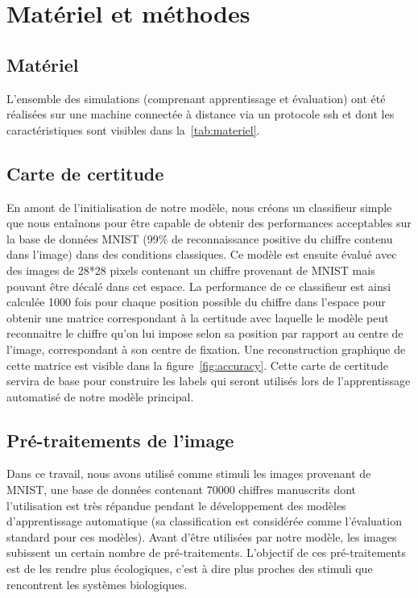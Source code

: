 
\chapter{Matériel et méthodes} %
\label{Materiel_methode} %

\section{Matériel}
L'ensemble des simulations (comprenant apprentissage et évaluation) ont été réalisées sur une machine connectée à distance via un protocole ssh et dont les caractéristiques sont visibles dans la~\autoref{tab:materiel}.

\section{Carte de certitude}
En amont de l'initialisation de notre modèle, nous créons un classifieur simple que nous entaînons pour être capable de obtenir des performances acceptables sur la base de données MNIST (99\% de reconnaissance positive du chiffre contenu dans l'image) dans des conditions classiques.
Ce modèle est ensuite évalué avec des images de 28*28 pixels contenant un chiffre provenant de MNIST mais pouvant être décalé dans cet espace.
La performance de ce classifieur est ainsi calculée 1000 fois pour chaque position possible du chiffre dans l'espace pour obtenir une matrice correspondant à la certitude avec laquelle le modèle peut reconnaitre le chiffre qu'on lui impose selon sa position par rapport au centre de l'image, correspondant à son centre de fixation.
Une reconstruction graphique de cette matrice est visible dans la figure~\ref{fig:accuracy}.
Cette carte de certitude servira de base pour construire les labels qui seront utilisés lors de l'apprentissage automatisé de notre modèle principal.

\section{Pré-traitements de l'image}
Dans ce travail, nous avons utilisé comme stimuli les images provenant de MNIST, une base de données contenant 70000 chiffres manuscrits dont l'utilisation est très répandue pendant le développement des modèles d'apprentissage automatique (sa classification est considérée comme l'évaluation standard pour ces modèles).
Avant d'être utilisées par notre modèle, les images subissent un certain nombre de pré-traitements. L'objectif de ces pré-traitements est de les rendre plus écologiques, c'est à dire plus proches des stimuli que rencontrent les systèmes biologiques.

